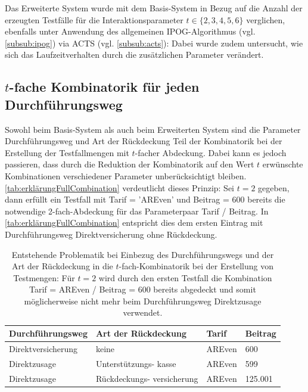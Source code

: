 Das Erweiterte System wurde mit dem Basis-System in Bezug auf die Anzahl der erzeugten Testfälle für die Interaktionsparameter $t \in \{2,3,4,5,6\}$ verglichen, ebenfalls unter Anwendung des allgemeinen IPOG-Algorithmus (vgl. \autoref{subsub:ipog}) via ACTS (vgl. \autoref{subsub:acts}): Dabei wurde zudem untersucht, wie sich das Laufzeitverhalten durch die zusätzlichen Parameter verändert.

\subsection{$t$-fache Kombinatorik für jeden Durchführungsweg}\label{subsec:ImplFullCombinations}

Sowohl beim Basis-System als auch beim Erweiterten System sind die Parameter Durchführungsweg und Art der Rückdeckung Teil der Kombinatorik bei der Erstellung der Testfallmengen mit $t$-facher Abdeckung. Dabei kann es jedoch passieren, dass durch die Reduktion der Kombinatorik auf den Wert $t$ erwünschte Kombinationen verschiedener Parameter unberücksichtigt bleiben. \autoref{tab:erklärungFullCombination} verdeutlicht dieses Prinzip: Sei $t=2$ gegeben, dann erfüllt ein Testfall mit Tarif = 'AREven' und Beitrag = 600 bereits die notwendige 2-fach-Abdeckung für das Parameterpaar Tarif / Beitrag. In \autoref{tab:erklärungFullCombination} entspricht dies dem ersten Eintrag mit Durchführungsweg Direktversicherung ohne Rückdeckung.

\renewcommand{\arraystretch}{2}
\begin{table}[!htb]
\footnotesize
\begin{tabular}{|M{\tabOther}|M{\tabOther}|M{\tabBeitrag}|M{\tabBeitrag}|}
\hline
{}Durchführungsweg & Art der Rückdeckung & Tarif & Beitrag \\ \hline
Direktversicherung      & keine                     & AREven   & 600   \\ \hline
Direktzusage       & Unterstützungs- kasse & AREven    & 599    \\ \hline
Direktzusage       & Rückdeckungs- versicherung & AREven    & 125.001     \\ \hline
\end{tabular}
\normalsize
\caption{Entstehende Problematik bei Einbezug des Durchführungswegs und der Art der Rückdeckung in die $t$-fach-Kombinatorik bei der Erstellung von Testmengen: Für $t=2$ wird durch den ersten Testfall die Kombination Tarif = \glqq AREven\grqq{} / Beitrag = 600 bereits abgedeckt und somit möglicherweise nicht mehr beim Durchführungsweg Direktzusage verwendet.}
\label{tab:erklärungFullCombination}
\end{table}
\renewcommand{\arraystretch}{1.5}

